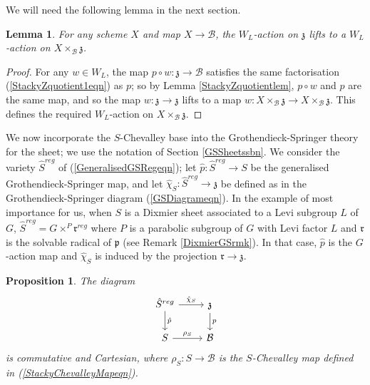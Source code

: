 \documentclass{amsart}
\newtheorem{lemma}[theorem]{Lemma}
\newtheorem{proposition}[theorem]{Proposition}
\theoremstyle{remark}
\numberwithin{theorem}{section}
\numberwithin{equation}{section}
\begin{document}
We will need the following lemma in the next section.

\begin{lemma}\label{WLInvariancelem}
    For any scheme $X$ and map $X \rightarrow \mathcal B$, the $W_L$-action on $\mathfrak{z}$ lifts to a $W_L$-action on $X \times_{\mathcal B} \mathfrak{z}$.
\end{lemma}

\begin{proof} 
For any $w \in W_L$, the map $p \circ w:\mathfrak{z} \rightarrow \mathcal B$ satisfies the same factorisation (\ref{StackyZquotient1eqn}) as $p$; so by Lemma \ref{StackyZquotientlem}, $p \circ w$ and $p$ are the same map, and so the map $w:\mathfrak{z} \rightarrow \mathfrak{z}$ lifts to a map $w:X \times_{\mathcal B} \mathfrak{z} \rightarrow X \times_{\mathcal B} \mathfrak{z}$. This defines the required $W_L$-action on $X \times_{\mathcal B} \mathfrak{z}$.
\end{proof}

We now incorporate the $S$-Chevalley base into the Grothendieck-Springer theory for the sheet; we use the notation of Section \ref{GSSheetssbn}. We consider the variety $\hat{S}^{reg}$ of (\ref{GeneralisedGSRegeqn}); let $\hat{p}:\hat{S}^{reg} \rightarrow S$ be the generalised Grothendieck-Springer map, and let $\hat{\chi}_S:\hat{S}^{reg} \rightarrow \mathfrak{z}$ be defined as in the Grothendieck-Springer diagram (\ref{GSDiagrameqn}). In the example of most importance for us, when $S$ is a Dixmier sheet associated to a Levi subgroup $L$ of $G$, $\hat{S}^{reg} = G \times^P \mathfrak{r}^{reg}$ where $P$ is a parabolic subgroup of $G$ with Levi factor $L$ and $\mathfrak{r}$ is the solvable radical of $\mathfrak{p}$ (see Remark \ref{DixmierGSrmk}). In that case, $\hat{p}$ is the $G$-action map and $\hat{\chi}_S$ is induced by the projection $\mathfrak{r} \rightarrow \mathfrak{z}$.

\begin{proposition}\label{StackyGSprp}
    The diagram
    \begin{equation}\label{StackyGSeqn}
        \begin{tikzcd}
         \hat{S}^{reg} \arrow[r, "\hat{\chi}_S"] \arrow[d, "\hat{p}"] & \mathfrak{z} \arrow[d, "p"] \\
            S \arrow[r, "\rho_S"]                                       & \mathcal B              
        \end{tikzcd}
    \end{equation}
    is commutative and Cartesian, where $\rho_S:S \rightarrow \mathcal B$ is the $S$-Chevalley map defined in (\ref{StackyChevalleyMapeqn}).
\end{proposition}
\end{document}

